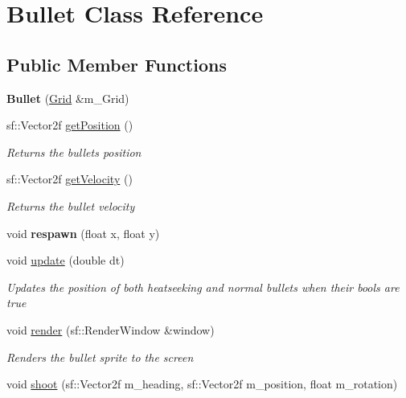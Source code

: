 \hypertarget{class_bullet}{}\section{Bullet Class Reference}
\label{class_bullet}
\subsection*{Public Member Functions}
\begin{DoxyCompactItemize}
\item 
\mbox{\label{class_bullet_a4e8c9e9ad30a2b883dfa7db4d6d9b529}} 
{\bfseries Bullet} (\mbox{\hyperlink{class_grid}{Grid}} \&m\+\_\+\+Grid)
\item 
sf\+::\+Vector2f \mbox{\hyperlink{class_bullet_a64e4ce634f62ab31d338bd142c1987c9}{get\+Position}} ()
\begin{DoxyCompactList}\small\item\em Returns the bullets position \end{DoxyCompactList}\item 
sf\+::\+Vector2f \mbox{\hyperlink{class_bullet_a212f3fa752a1cff3b10312795c78705d}{get\+Velocity}} ()
\begin{DoxyCompactList}\small\item\em Returns the bullet velocity \end{DoxyCompactList}\item 
\mbox{\label{class_bullet_a1bd1e35612988f63316c8f95ac35112b}} 
void {\bfseries respawn} (float x, float y)
\item 
void \mbox{\hyperlink{class_bullet_a854416dc6aa91ff20858a11d0333b8cc}{update}} (double dt)
\begin{DoxyCompactList}\small\item\em Updates the position of both heatseeking and normal bullets when their bools are true \end{DoxyCompactList}\item 
void \mbox{\hyperlink{class_bullet_acea71a980a81ac7da86099d2aa9d433c}{render}} (sf\+::\+Render\+Window \&window)
\begin{DoxyCompactList}\small\item\em Renders the bullet sprite to the screen \end{DoxyCompactList}\item 
void \mbox{\hyperlink{class_bullet_ae321c1bab25a1a9d2d9fedbdafbed2bc}{shoot}} (sf\+::\+Vector2f m\+\_\+heading, sf\+::\+Vector2f m\+\_\+position, float m\+\_\+rotation)

\end{DoxyCompactItemize}
